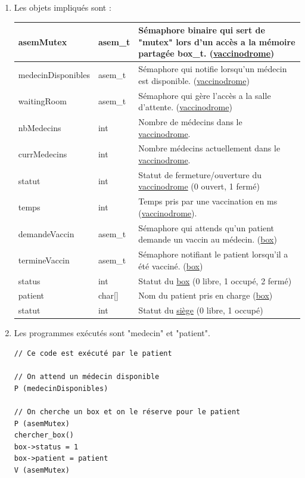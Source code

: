 \documentclass[a4paper]{article}
\begin{document}
  \begin{enumerate}
    \item Les objets impliqués sont :

    \begin{tabularx}{\linewidth}{|l|l|>{\strut}X|}
      \hline%
    asemMutex & asem\_t & Sémaphore binaire qui sert de "mutex" lors d'un accès a la mémoire partagée box\_t. (\underline{vaccinodrome}) \\ \hline%
    medecinDisponibles & asem\_t & Sémaphore qui notifie lorsqu'un médecin est disponible. (\underline{vaccinodrome}) \\ \hline%
    waitingRoom & asem\_t & Sémaphore qui gère l'accès a la salle d'attente. (\underline{vaccinodrome}) \\ \hline%
    nbMedecins & int & Nombre de médecins dans le \underline{vaccinodrome}. \\ \hline%
    currMedecins & int & Nombre médecins actuellement dans le \underline{vaccinodrome}. \\ \hline%
    statut & int & Statut de fermeture/ouverture du \underline{vaccinodrome} (0 ouvert, 1 fermé) \\ \hline%
    temps & int & Temps pris par une vaccination en ms (\underline{vaccinodrome}). \\ \hline%

  demandeVaccin & asem\_t & Sémaphore qui attends qu'un patient demande un vaccin au médecin. (\underline{box}) \\ \hline%
termineVaccin & asem\_t & Sémaphore notifiant le patient lorsqu'il a été vacciné. (\underline{box}) \\ \hline%
status & int & Statut du \underline{box} (0 libre, 1 occupé, 2 fermé) \\ \hline%
patient & char[] & Nom du patient pris en charge (\underline{box})\\ \hline%
 statut & int & Statut du \underline{siège} (0 libre, 1 occupé) \\ \hline%
    \end{tabularx}

  \item Les programmes exécutés sont "medecin" et "patient".

\begin{verbatim}
// Ce code est exécuté par le patient

// On attend un médecin disponible
P (medecinDisponibles)

// On cherche un box et on le réserve pour le patient
P (asemMutex)
chercher_box()
box->status = 1
box->patient = patient
V (asemMutex)


\end{verbatim}
\end{enumerate}
\end{document}
